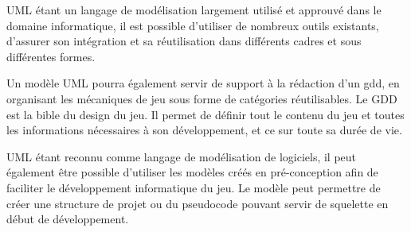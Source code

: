 UML étant un langage de modélisation largement utilisé et approuvé dans le domaine informatique, il est possible d'utiliser de nombreux outils existants, d'assurer son intégration et sa réutilisation dans différents cadres et sous différentes formes.

Un modèle UML pourra également servir de support à la rédaction d'un \gls{gdd}, en organisant les mécaniques de jeu sous forme de catégories réutilisables.
Le GDD est la \guillemotleft bible du design \guillemotright \cite{GD_foundations_pedersen} du jeu.
Il permet de définir tout le contenu du jeu et toutes les informations nécessaires à son développement, et ce sur toute sa durée de vie. 

UML étant reconnu comme langage de modélisation de logiciels, il peut également être possible d'utiliser les modèles créés en pré-conception afin de faciliter le développement informatique du jeu.
Le modèle peut permettre de créer une structure de projet ou du pseudocode pouvant servir de squelette en début de développement.


